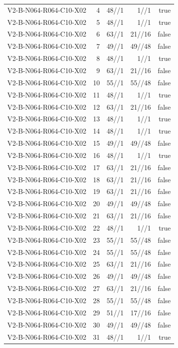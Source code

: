 {\begin{longtable}{lrrrr}
V2-B-N064-R064-C10-X02 & 4 & 48//1 & 1//1 & true \\
V2-B-N064-R064-C10-X02 & 5 & 48//1 & 1//1 & true \\
V2-B-N064-R064-C10-X02 & 6 & 63//1 & 21//16 & false \\
V2-B-N064-R064-C10-X02 & 7 & 49//1 & 49//48 & false \\
V2-B-N064-R064-C10-X02 & 8 & 48//1 & 1//1 & true \\
V2-B-N064-R064-C10-X02 & 9 & 63//1 & 21//16 & false \\
V2-B-N064-R064-C10-X02 & 10 & 55//1 & 55//48 & false \\
V2-B-N064-R064-C10-X02 & 11 & 48//1 & 1//1 & true \\
V2-B-N064-R064-C10-X02 & 12 & 63//1 & 21//16 & false \\
V2-B-N064-R064-C10-X02 & 13 & 48//1 & 1//1 & true \\
V2-B-N064-R064-C10-X02 & 14 & 48//1 & 1//1 & true \\
V2-B-N064-R064-C10-X02 & 15 & 49//1 & 49//48 & false \\
V2-B-N064-R064-C10-X02 & 16 & 48//1 & 1//1 & true \\
V2-B-N064-R064-C10-X02 & 17 & 63//1 & 21//16 & false \\
V2-B-N064-R064-C10-X02 & 18 & 63//1 & 21//16 & false \\
V2-B-N064-R064-C10-X02 & 19 & 63//1 & 21//16 & false \\
V2-B-N064-R064-C10-X02 & 20 & 49//1 & 49//48 & false \\
V2-B-N064-R064-C10-X02 & 21 & 63//1 & 21//16 & false \\
V2-B-N064-R064-C10-X02 & 22 & 48//1 & 1//1 & true \\
V2-B-N064-R064-C10-X02 & 23 & 55//1 & 55//48 & false \\
V2-B-N064-R064-C10-X02 & 24 & 55//1 & 55//48 & false \\
V2-B-N064-R064-C10-X02 & 25 & 63//1 & 21//16 & false \\
V2-B-N064-R064-C10-X02 & 26 & 49//1 & 49//48 & false \\
V2-B-N064-R064-C10-X02 & 27 & 63//1 & 21//16 & false \\
V2-B-N064-R064-C10-X02 & 28 & 55//1 & 55//48 & false \\
V2-B-N064-R064-C10-X02 & 29 & 51//1 & 17//16 & false \\
V2-B-N064-R064-C10-X02 & 30 & 49//1 & 49//48 & false \\
V2-B-N064-R064-C10-X02 & 31 & 48//1 & 1//1 & true \\

\end{longtable}}
